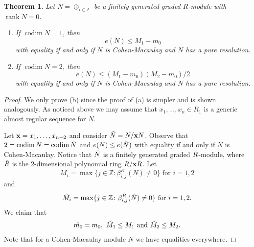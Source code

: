 \documentclass[12pt,twoside]{amsart}
\numberwithin{equation}{section}
\newcommand{\Z}{\mathbb{Z}}
\newcommand{\xb}{{\bf x}}
\DeclareMathOperator{\codim}{codim}
\DeclareMathOperator{\rank}{rank}
\DeclareMathOperator{\dirsum}{\oplus}
\newtheorem{theorem}{Theorem}[section]
\theoremstyle{definition}
\begin{document}
\begin{theorem}
\label{modulecodim2} Let $N=\dirsum_{i\in \Z}$ be a finitely generated graded $R$-module
with $\rank N=0$.
\begin{enumerate}
\item
If $\codim N =1$, then
$$
e(N) \leq M_1-m_0
$$
with equality if and only if $N$ is Cohen-Macaulay and $N$ has a pure resolution.
\item
If $\codim N =2$, then
$$
e(N) \leq (M_1-m_0) (M_2-m_0)/2
$$
with equality if and only if $N$ is Cohen-Macaulay and $N$ has a pure resolution.
\end{enumerate}
\end{theorem}
\begin{proof}
We only prove (b) since the proof of (a) is simpler and is shown analogously. As noticed
above we may assume that  $x_1,\ldots,x_n \in R_1$ is a generic almost regular sequence
for $N$.

Let $\xb=x_1,\ldots,x_{n-2}$ and consider $\Tilde{N}=N/\xb N$. Observe that $2=\codim
N=\codim \Tilde{N}$ and $e(N)\leq e(\Tilde{N})$ with equality if and only if $N$ is
Cohen-Macaulay. Notice that $\Tilde{N}$ is a finitely generated graded
$\Tilde{R}$-module, where $\Tilde{R}$ is the 2-dimensional polynomial ring $R/\xb R$. Let
$$
M_i=\max\{j\in \Z\colon \beta^R_{i,j}(N)\neq 0\} \text{ for } i=1,2
$$
and
$$
\Tilde{M}_i=\max\{j\in \Z\colon \beta^{\Tilde{R}}_{i,j}(\Tilde{N})\neq 0\} \text{ for }
i=1,2.
$$
We claim that
\begin{equation}
\label{claim}
\Tilde{m_0}=m_0,\ \Tilde{M}_1 \leq M_1 \text{ and } \Tilde{M}_2\leq M_2.
\end{equation}
Note that for a Cohen-Macaulay module $N$ we have equalities everywhere.


\end{proof}
\end{document}
